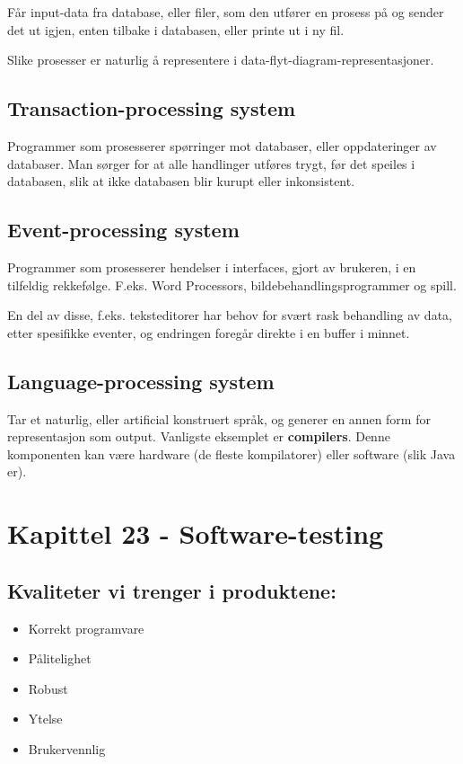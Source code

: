 \documentclass[11pt]{article}
\begin{document}
   Får input-data fra database, eller filer, som den utfører en prosess på og sender det 
   ut igjen, enten tilbake i databasen, eller printe ut i ny fil.

   Slike prosesser er naturlig å representere i data-flyt-diagram-representasjoner. 
\subsection{Transaction-processing system}
\label{sec-8.2}

   Programmer som prosesserer spørringer mot databaser, eller oppdateringer av databaser. 
   Man sørger for at alle handlinger utføres trygt, før det speiles i databasen, slik at ikke databasen blir kurupt eller inkonsistent.
\subsection{Event-processing system}
\label{sec-8.3}

   Programmer som prosesserer hendelser i interfaces, gjort av brukeren, i en tilfeldig rekkefølge. 
   F.eks. Word Processors, bildebehandlingsprogrammer og spill.

   En del av disse, f.eks. teksteditorer har behov for svært rask behandling av data, 
   etter spesifikke eventer, og endringen foregår direkte i en buffer i minnet.
\subsection{Language-processing system}
\label{sec-8.4}

   Tar et naturlig, eller artificial konstruert språk, og generer en annen form 
   for representasjon som output. Vanligste eksemplet er \textbf{compilers}. Denne komponenten kan 
   være hardware (de fleste kompilatorer) eller software (slik Java er). 
\section{Kapittel 23 - Software-testing}
\label{sec-9}
\subsection{Kvaliteter vi trenger i produktene:}
\label{sec-9.1}

\begin{itemize}
\item Korrekt programvare
\item Pålitelighet
\item Robust
\item Ytelse
\item Brukervennlig
\end{itemize}
\end{document}
